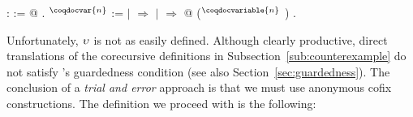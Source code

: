 \begin{singlespace}
\begin{coqdoccode}
\coqdocnoindent
{}
:  :=
 @
.\coqdoceol
\coqdocemptyline
\coqdocnoindent
{}
$^\coqdocvar{n}$
 :=\coqdoceol
\coqdocindent{1.00em}
  \coqdoceol
\coqdocindent{1.00em}
\ensuremath{|}
\ensuremath{\Rightarrow} \coqdoceol
\coqdocindent{1.00em}
\ensuremath{|}
 \ensuremath{\Rightarrow}
 @
($^\coqdocvariable{n}$
)\coqdoceol
\coqdocindent{1.00em}
.\coqdoceol
\end{coqdoccode}
\end{singlespace}
Unfortunately, $\upsilon$ is not as easily defined. Although clearly
productive, direct translations of the corecursive definitions in
Subsection~\ref{sub:counterexample} do not satisfy \Coq's guardedness
condition (see also Section~\ref{sec:guardedness}). The conclusion of
a \emph{trial and error} approach is that we must use anonymous cofix
constructions. The definition we proceed with is the following:
